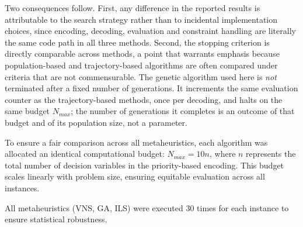 \documentclass[preprint,12pt,authoryear]{elsarticle}
\begin{document}
Two consequences follow. First, any difference in the reported results is attributable to the search strategy
rather than to incidental implementation choices, since encoding, decoding, evaluation and constraint handling are
literally the same code path in all three methods. Second, the stopping criterion is directly comparable across
methods, a point that warrants emphasis because population-based and trajectory-based algorithms are often compared
under criteria that are not commensurable. The genetic algorithm used here is \emph{not} terminated after a fixed
number of generations. It increments the same evaluation counter as the trajectory-based methods, once per
decoding, and halts on the same budget $N_{max}$; the number of generations it completes is an outcome of that
budget and of its population size, not a parameter.

To ensure a fair comparison across all metaheuristics, each algorithm was allocated an identical computational budget: $N_{max} = 10n$, where $n$ represents the total number of
decision variables in the priority-based encoding. This budget scales linearly with problem size, ensuring equitable evaluation across all instances.

All metaheuristics (VNS, GA, ILS) were executed 30 times for each instance to ensure statistical robustness.

%
%
\end{document}
